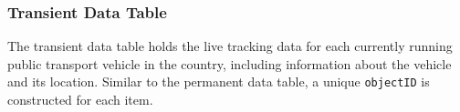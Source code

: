 \documentclass[a4paper,11pt]{report}
\begin{document}
%
%
%

\subsubsection{Transient Data Table}
The transient data table holds the live tracking data for each currently running public transport vehicle in the country, including information about the vehicle and its location.
Similar to the permanent data table, a unique \verb|objectID| is constructed for each item.
\end{document}
